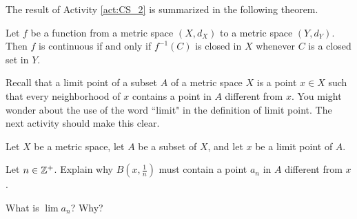\begin{comment}

\ActivitySolution

\ba
\item Since $C$ is closed, we know that $Y \setminus C$ is open. This means that $f^{-1}(Y \setminus C)$ is also open. Activity \ref{act:CS_1} tell us that $f^{-1}(Y \setminus B) = X \setminus f^{-1}(C)$. The fact that $X \setminus f^{-1}(C)$ is open implies that $f^{-1}(C)$ is closed. 

\item Suppose $O$ is an open set in $Y$. Then $Y \setminus O$ is a closed set. Activity \ref{act:CS_1} tells us that $f^{-1}(Y \setminus O) = X \setminus f^{-1}(O)$. That $X \setminus f^{-1}(O)$ is closed means that $f^{-1}(O)$ is open. Thus, $f$ is a continuous function. 

\ea

\end{comment}

The result of Activity \ref{act:CS_2} is summarized in the following theorem.

\begin{theorem} \label{thm:closed_sets_continuity_MS} Let $f$ be a function from a metric space $(X,d_X)$ to a metric space $(Y,d_Y)$. Then $f$ is continuous if and only if $f^{-1}(C)$ is closed in $X$ whenever $C$ is a closed set in $Y$.  
\end{theorem}


Recall that a limit point of a subset $A$ of a metric space $X$ is a point $x \in X$ such that every neighborhood of $x$ contains a point in $A$ different from $x$. You might wonder about the use of the word ``limit" in the definition of limit point. The next activity should make this clear. 

\begin{activity} \label{act:CS_3} Let $X$ be a metric space, let $A$ be a subset of $X$, and let $x$ be a limit point of $A$. 
\ba
\item Let $n \in \mathbb{Z}^+$. Explain why $B\left(x, \frac{1}{n}\right)$ must contain a point $a_n$ in $A$ different from $x$. 

\item What is $\lim a_n$? Why?

\ea

\end{activity}

